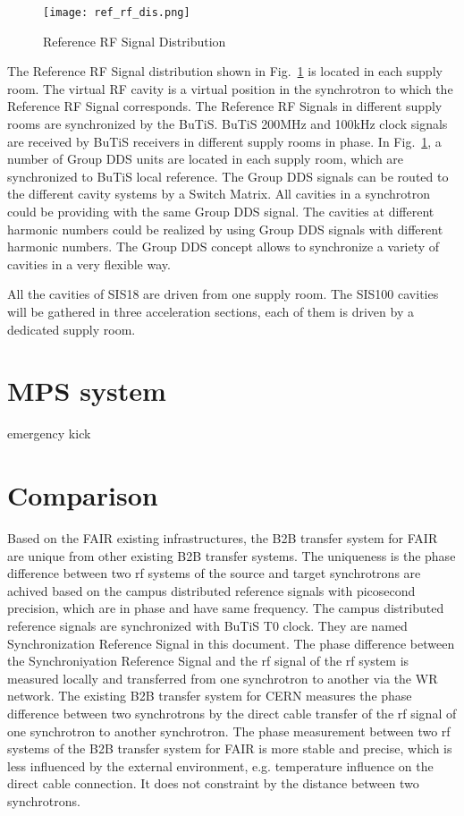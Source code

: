 \begin{figure}[H]
   \centering   
   \texttt{[image: ref\_rf\_dis.png]}
   \caption{Reference RF Signal Distribution}
   \label{ref_rf_dis}
\end{figure}
The Reference RF Signal distribution shown in Fig.~\ref{ref_rf_dis} is located in each supply room. The virtual RF cavity is a virtual position in the synchrotron to which the Reference RF Signal corresponds. The Reference RF Signals in different supply rooms are synchronized by the BuTiS. BuTiS 200MHz and 100kHz clock signals are received by BuTiS receivers in different supply rooms in phase. In Fig.~\ref{ref_rf_dis}, a number of Group DDS units are located in each supply room, which are synchronized to BuTiS local reference. The Group DDS signals can be routed to the different cavity systems by a Switch Matrix. All cavities in a synchrotron could be providing with the same Group DDS signal. The cavities at different harmonic numbers could be realized by using Group DDS signals with different harmonic numbers. The Group DDS concept allows to synchronize a variety of cavities in a very flexible way. 

All the cavities of SIS18 are driven from one supply room. The SIS100 cavities will be gathered in three acceleration sections, each of them is driven by a dedicated supply room. 

\section{\gls{MPS} system}
emergency kick


\section{Comparison}

Based on the FAIR existing infrastructures, the B2B transfer system for FAIR are unique from other existing B2B transfer systems. The uniqueness is the phase difference between two rf systems of the source and target synchrotrons are achived based on the campus distributed reference signals with picosecond precision, which are in phase and have same frequency. The campus distributed reference signals are synchronized with BuTiS T0 clock. They are named Synchronization Reference Signal in this document. The phase difference between the Synchroniyation Reference Signal and the rf signal of the rf system is measured locally and transferred from one synchrotron to another via the WR network. The existing B2B transfer system for CERN measures the phase difference between two synchrotrons by the direct cable transfer of the rf signal of one synchrotron to another synchrotron. The phase measurement between two rf systems of the B2B transfer system for FAIR is more stable and precise, which is less influenced by the external environment, e.g. temperature influence on the direct cable connection. It does not constraint by the distance between two synchrotrons.

